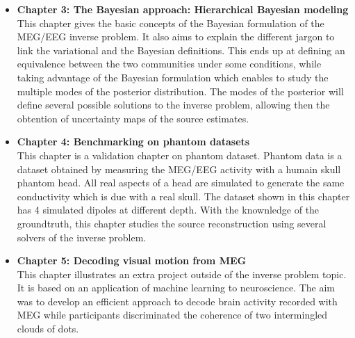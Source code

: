 \begin{itemize}
\item \textbf{Chapter 3: The Bayesian approach: Hierarchical Bayesian modeling}\\
This chapter gives the basic concepts of the Bayesian formulation of the MEG/EEG inverse problem. It also aims to explain the different jargon to link the variational and the Bayesian definitions. This ends up at defining an equivalence between the two communities under some conditions, while taking advantage of the Bayesian formulation which enables to study the multiple modes of the posterior distribution. The modes of the posterior will define several possible solutions to the inverse problem, allowing then the obtention of uncertainty maps of the source estimates. 

\item \textbf{Chapter 4: Benchmarking on phantom datasets}\\
This chapter is a validation chapter on phantom dataset. Phantom data is a dataset obtained by measuring the MEG/EEG activity with a humain skull phantom head. All real aspects of a head are simulated to generate the same conductivity which is due with a real skull. The dataset shown in this chapter has 4 simulated dipoles at different depth. With the knownledge of the groundtruth, this chapter studies the source reconstruction using several solvers of the inverse problem.

\item \textbf{Chapter 5: Decoding visual motion from MEG}\\
This chapter illustrates an extra project outside of the inverse problem topic. It is based on an application of machine learning to neuroscience. The aim was to develop an efficient approach to decode brain activity recorded with MEG while participants discriminated the coherence of two intermingled clouds of dots.
\end{itemize}
